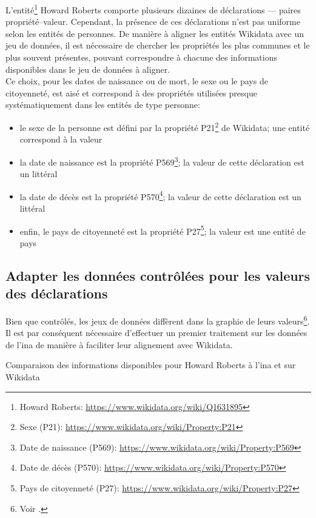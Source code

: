 L'entité\footnote{Howard Roberts: \url{https://www.wikidata.org/wiki/Q1631895}} Howard Roberts comporte plusieurs dizaines de déclarations --- paires propriété--valeur. Cependant, la présence de ces déclarations n'est pas uniforme selon les entités de personnes. De manière à aligner les entités Wikidata avec un jeu de données, il est nécessaire de chercher les propriétés les plus communes et le plus souvent présentes, pouvant correspondre à chacune des informations disponibles dans le jeu de données à aligner.\\

Ce choix, pour les dates de naissance ou de mort, le sexe ou le pays de citoyenneté, est aisé et correspond à des propriétés utilisées presque systématiquement dans les entités de type personne:
\begin{itemize}
	\item le sexe de la personne est défini par la propriété P21\footnote{Sexe (P21): \url{https://www.wikidata.org/wiki/Property:P21}} de Wikidata; une entité correspond à la valeur
	\item la date de naissance est la propriété P569\footnote{Date de naissance (P569): \url{https://www.wikidata.org/wiki/Property:P569}}; la valeur de cette déclaration est un littéral
	\item la date de décès est la propriété P570\footnote{Date de décès (P570): \url{https://www.wikidata.org/wiki/Property:P570}}; la valeur de cette déclaration est un littéral
	\item enfin, le pays de citoyenneté est la propriété P27\footnote{Pays de citoyenneté (P27): \url{https://www.wikidata.org/wiki/Property:P27}}; la valeur est une entité de pays
\end{itemize} 

\subsection{\label{II-C-2-b} Adapter les données contrôlées pour les valeurs des déclarations}

Bien que contrôlés, les jeux de données diffèrent dans la graphie de leurs valeurs\footnote{Voir .}. Il est par conséquent nécessaire d'effectuer un premier traitement sur les données de l'\ac{ina} de manière à faciliter leur alignement avec Wikidata.
\begin{table}[h!]
	\centering
	\caption{Comparaison des informations disponibles pour Howard Roberts à l'\ac{ina} et sur Wikidata}
	\label{table_roberts_2}
\end{table}

